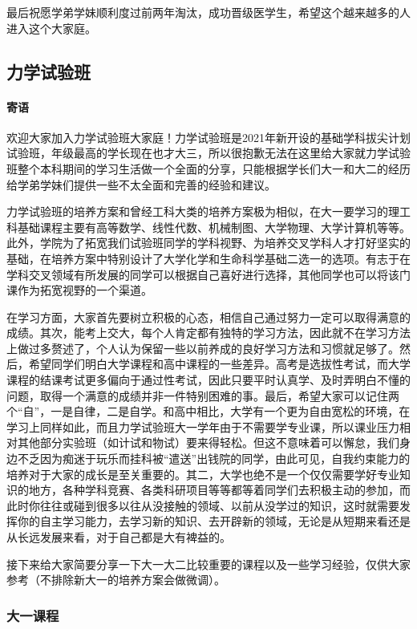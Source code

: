 \documentclass[
decoration,  %
]{qyxf-book}
\begin{document}
最后祝愿学弟学妹顺利度过前两年淘汰，成功晋级医学生，希望这个越来越多的人进入这个大家庭。


\subsection{力学试验班}
\paragraph{寄语}\par
欢迎大家加入力学试验班大家庭！力学试验班是2021年新开设的基础学科拔尖计划试验班，年级最高的学长现在也才大三，所以很抱歉无法在这里给大家就力学试验班整个本科期间的学习生活做一个全面的分享，只能根据学长们大一和大二的经历给学弟学妹们提供一些不太全面和完善的经验和建议。


力学试验班的培养方案和曾经工科大类的培养方案极为相似，在大一要学习的理工科基础课程主要有高等数学、线性代数、机械制图、大学物理、大学计算机等等。此外，学院为了拓宽我们试验班同学的学科视野、为培养交叉学科人才打好坚实的基础，在培养方案中特别设计了大学化学和生命科学基础二选一的选项。有志于在学科交叉领域有所发展的同学可以根据自己喜好进行选择，其他同学也可以将该门课作为拓宽视野的一个渠道。


在学习方面，大家首先要树立积极的心态，相信自己通过努力一定可以取得满意的成绩。其次，能考上交大，每个人肯定都有独特的学习方法，因此就不在学习方法上做过多赘述了，个人认为保留一些以前养成的良好学习方法和习惯就足够了。然后，希望同学们明白大学课程和高中课程的一些差异。高考是选拔性考试，而大学课程的结课考试更多偏向于通过性考试，因此只要平时认真学、及时弄明白不懂的问题，取得一个满意的成绩并非一件特别困难的事。最后，希望大家可以记住两个“自”，一是自律，二是自学。和高中相比，大学有一个更为自由宽松的环境，在学习上同样如此，而且力学试验班大一学年由于不需要学专业课，所以课业压力相对其他部分实验班（如计试和物试）要来得轻松。但这不意味着可以懈怠，我们身边不乏因为痴迷于玩乐而挂科被“遣送”出钱院的同学，由此可见，自我约束能力的培养对于大家的成长是至关重要的。其二，大学也绝不是一个仅仅需要学好专业知识的地方，各种学科竞赛、各类科研项目等等都等着同学们去积极主动的参加，而此时你往往或碰到很多以往从没接触的领域、以前从没学过的知识，这时就需要发挥你的自主学习能力，去学习新的知识、去开辟新的领域，无论是从短期来看还是从长远发展来看，对于自己都是大有裨益的。


接下来给大家简要分享一下大一大二比较重要的课程以及一些学习经验，仅供大家参考（不排除新大一的培养方案会做微调）。

\subsubsection{大一课程}
\end{document}

